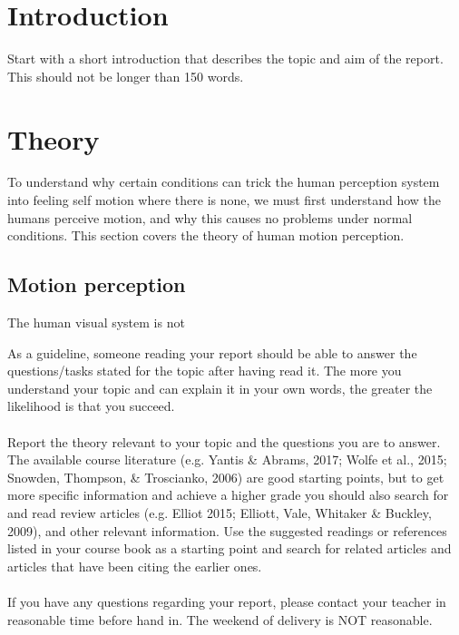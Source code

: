 \documentclass[11pt,a4paper,oneside,table,xcdraw]{article}
\begin{document}
	\section{Introduction}
	Start with a short introduction that describes the topic and aim of the report. This should not be longer than 150 words.
	\section{Theory}
	To understand why certain conditions can trick the human perception system into feeling self motion where there is none, we must first understand how the humans perceive motion, and why this causes no problems under normal conditions. This section covers the theory of human motion perception. 
\subsection{Motion perception}
	The human visual system is not  	


	As a guideline, someone reading your report should be able to answer the questions/tasks stated for the topic after having read it. The more you understand your topic and can explain it in your own words, the greater the likelihood is that you succeed.\\\\
	Report the theory relevant to your topic and the questions you are to answer. The available course literature (e.g. Yantis \& Abrams, 2017; Wolfe et al., 2015; Snowden, Thompson, \& Troscianko, 2006) are good starting points, but to get more specific information and achieve a higher grade you should also search for and read review articles (e.g. Elliot 2015; Elliott, Vale, Whitaker \& Buckley, 2009), and other relevant information. Use the suggested readings or references listed in your course book as a starting point and search for related articles and articles that have been citing the earlier ones.\\\\
	If you have any questions regarding your report, please contact your teacher in reasonable time before hand in. The weekend of delivery is NOT reasonable.
\end{document}
